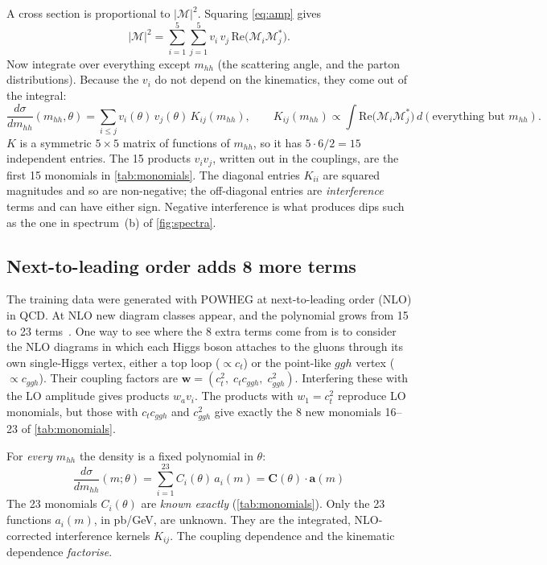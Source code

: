 \documentclass[11pt]{article}
\newcommand{\mhh}{m_{hh}}
\newcommand{\ct}{c_t}
\newcommand{\cggh}{c_{ggh}}
\newcommand{\bC}{\boldsymbol{C}}
\newcommand{\ba}{\boldsymbol{a}}
\begin{document}
A cross section is proportional to $|\mathcal{M}|^2$. Squaring
\cref{eq:amp} gives
\begin{equation}
  |\mathcal{M}|^2 = \sum_{i=1}^{5}\sum_{j=1}^{5} v_i\, v_j\,
  \mathrm{Re}\big(\mathcal{M}_i\mathcal{M}_j^*\big).
\end{equation}
Now integrate over everything except $\mhh$ (the scattering angle, and the
parton distributions). Because the $v_i$ do not depend on
the kinematics, they come out of the integral:
\begin{equation}
  \frac{d\sigma}{d\mhh}(\mhh,\theta) = \sum_{i\le j} v_i(\theta)\,v_j(\theta)\, K_{ij}(\mhh),
  \qquad
  K_{ij}(\mhh) \propto \int \mathrm{Re}\big(\mathcal{M}_i\mathcal{M}_j^*\big)\,
  d(\text{everything but } \mhh).
  \label{eq:quadratic}
\end{equation}
$K$ is a symmetric $5\times 5$ matrix of functions of $\mhh$, so it has
$5\cdot 6/2 = 15$ independent entries. The 15 products $v_iv_j$, written out in the
couplings, are the first 15 monomials in \cref{tab:monomials}. The diagonal
entries $K_{ii}$ are squared magnitudes and so are non-negative; the off-diagonal
entries are \emph{interference} terms and can have either sign. Negative
interference is what produces dips such as the one in spectrum~(b) of
\cref{fig:spectra}.

\subsection{Next-to-leading order adds 8 more terms}

The training data were generated with POWHEG at next-to-leading order (NLO) in
QCD. At NLO new diagram classes appear, and the polynomial grows from 15 to 23
terms~\cite{alasfar}. One way to see where the 8 extra terms come from is to
consider the NLO diagrams in which each Higgs boson attaches to the gluons through
its own single-Higgs vertex, either a top loop ($\propto\ct$) or the point-like
$ggh$ vertex ($\propto\cggh$). Their coupling factors are
$\boldsymbol{w} = (\ct^2,\;\ct\cggh,\;\cggh^2)$. Interfering these with the LO
amplitude gives products $w_a v_i$. The products with $w_1=\ct^2$ reproduce LO
monomials, but those with $\ct\cggh$ and $\cggh^2$ give exactly the 8 new monomials
16--23 of \cref{tab:monomials}.


\begin{keyidea}
For \emph{every} $\mhh$ the density is a fixed polynomial in $\theta$:
\begin{equation}
  \boxed{\;\frac{d\sigma}{d\mhh}(m;\theta) = \sum_{i=1}^{23} C_i(\theta)\, a_i(m)
  = \bC(\theta)\cdot\ba(m)\;}
  \label{eq:factorised}
\end{equation}
The 23 monomials $C_i(\theta)$ are \emph{known exactly} (\cref{tab:monomials}). Only the 23
functions $a_i(m)$, in pb/GeV, are unknown. They are the integrated, NLO-corrected
interference kernels $K_{ij}$. The coupling dependence and the kinematic dependence
\emph{factorise}.
\end{keyidea}
\end{document}

